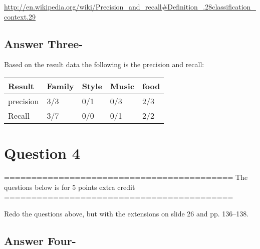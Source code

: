 \documentclass[letterpaper,11pt]{article}
\begin{document}
\url{http://en.wikipedia.org/wiki/Precision_and_recall#Definition_.28classification_context.29}

\newpage
\subsection*{Answer Three-}
Based on the result data the following is the precision and recall:


\begin{table}[htbp]
        \centering
\begin{tabular}{|p{8cm}|l|l|l|l|}
\hline
Result & Family & Style & Music & food \\ \hline
precision & 3/3 & 0/1 & 0/3 & 2/3\\ \hline
Recall & 3/7 & 0/0 & 0/1 & 2/2\\ \hline

\end{tabular}
\label{tab:results}
\end{table}

\newpage
\section*{Question 4}
==========================================
The questions below is for 5 points extra credit
==========================================

Redo the questions above, but with the extensions on slide 26
and pp. 136--138.
\newpage
\subsection*{Answer Four-}
\newpage
\end{document}
